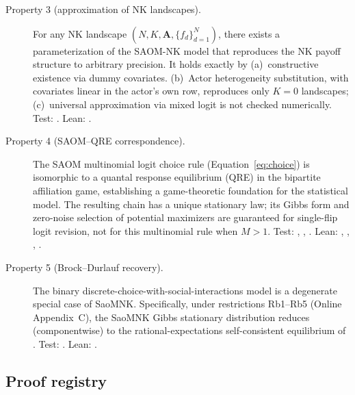 \documentclass[
  article]{jss}
\begin{document}
\begin{description}
\item[Property 3 (approximation of NK landscapes).] For any NK landscape
$(N, K, \mathbf{A}, \{f_d\}_{d=1}^N)$, there exists a parameterization
of the SAOM-NK model that reproduces the NK payoff structure to arbitrary
precision.  It holds exactly by (a)~constructive existence via dummy
covariates.  (b)~Actor heterogeneity substitution, with covariates linear in the
actor's own row, reproduces only $K = 0$ landscapes; (c)~universal
approximation via mixed logit is not checked numerically.
\newline Test: .
\newline Lean: .

\item[Property 4 (SAOM--QRE correspondence).] The SAOM multinomial logit choice
rule (Equation~\ref{eq:choice}) is isomorphic to a quantal response
equilibrium (QRE) in the bipartite affiliation game, establishing a
game-theoretic foundation for the statistical model.  The resulting chain has a
unique stationary law; its Gibbs form and zero-noise selection of potential
maximizers are guaranteed for single-flip logit revision, not for this
multinomial rule when $M > 1$.
\newline Test: , , .
\newline Lean: , , , .

\item[Property 5 (Brock--Durlauf recovery).] The \citet{BrockDurlauf2001} binary
discrete-choice-with-social-interactions model is a degenerate special case of
SaoMNK. Specifically, under restrictions Rb1--Rb5 (Online Appendix~C), the SaoMNK Gibbs stationary
distribution reduces (componentwise) to the rational-expectations
self-consistent equilibrium of \citet{BrockDurlauf2001}.
\newline Test: .
\newline Lean: .

\end{description}

\subsection{Proof registry}\label{sec:proofs}
\end{document}
